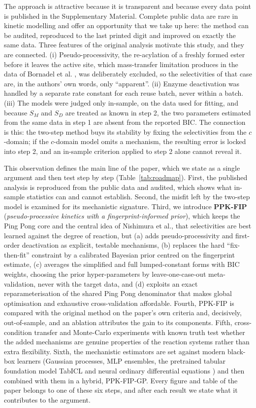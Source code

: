 The approach is attractive because it is transparent and because every data point is published in the Supplementary Material. Complete public data are rare in kinetic modelling and offer an opportunity that we take up here: the method can be audited, reproduced to the last printed digit and improved on exactly the same data. Three features of the original analysis motivate this study, and they are connected. (i) Pseudo-processivity, the re-acylation of a freshly formed ester before it leaves the active site, which mass-transfer limitation produces in the data of Bornadel et al. \cite{bornadel2013,mitchell2023}, was deliberately excluded, so the selectivities of that case are, in the authors' own words, only ``apparent''. (ii) Enzyme deactivation was handled by a separate rate constant for each reuse batch, never within a batch. (iii) The models were judged only in-sample, on the data used for fitting, and because $S_M$ and $S_D$ are treated as known in step 2, the two parameters estimated from the same data in step 1 are absent from the reported BIC. The connection is this: the two-step method buys its stability by fixing the selectivities from the $c$-domain; if the $c$-domain model omits a mechanism, the resulting error is locked into step 2, and an in-sample criterion applied to step 2 alone cannot reveal it.

This observation defines the main line of the paper, which we state as a single argument and then test step by step (Table~\ref{tab:roadmap}). First, the published analysis is reproduced from the public data and audited, which shows what in-sample statistics can and cannot establish. Second, the misfit left by the two-step model is examined for its mechanistic signature. Third, we introduce \textbf{PPK-FIP} (\emph{pseudo-processive kinetics with a fingerprint-informed prior}), which keeps the Ping Pong core and the central idea of Nishimura et al., that selectivities are best learned against the degree of reaction, but (a) adds pseudo-processivity and first-order deactivation as explicit, testable mechanisms, (b) replaces the hard ``fix-then-fit'' constraint by a calibrated Bayesian prior centred on the fingerprint estimate, (c) averages the simplified and full lumped-constant forms with BIC weights, choosing the prior hyper-parameters by leave-one-case-out meta-validation, never with the target data, and (d) exploits an exact reparameterisation of the shared Ping Pong denominator that makes global optimisation and exhaustive cross-validation affordable. Fourth, PPK-FIP is compared with the original method on the paper's own criteria and, decisively, out-of-sample, and an ablation attributes the gain to its components. Fifth, cross-condition transfer and Monte-Carlo experiments with known truth test whether the added mechanisms are genuine properties of the reaction systems rather than extra flexibility. Sixth, the mechanistic estimators are set against modern black-box learners (Gaussian processes, MLP ensembles, the pretrained tabular foundation model TabICL \cite{qu2025tabicl} and neural ordinary differential equations \cite{chen2018}) and then combined with them in a hybrid, PPK-FIP-GP. Every figure and table of the paper belongs to one of these six steps, and after each result we state what it contributes to the argument.

